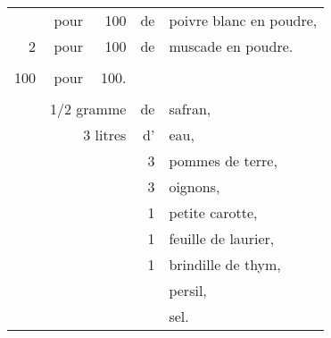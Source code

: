 \begin{longtable}{rrrrp{16em}}
{\begin{tabular}{rrrrl}
              \hspace{4em}            6 & pour & 100  & de & poivre blanc en poudre,          \\ 
              \hspace{4em}            2 & pour & 100  & de & muscade en poudre.               \\ 
              \hspace{4em}   \hrulefill &      &      &    &                                  \\ 
              \hspace{4em}          100 & pour & 100. &    &                                  \\ 
              \end{tabular}},                                                                             \\ 
                                                    \index{Composition de la poudre de curry}
                                                    \index{Curry}
  & \multicolumn{2}{r}{1/2 gramme} & de & safran,                                                         \\
  & \multicolumn{2}{r}{3 litres}   & d' & eau,                                                            \\
  &     &          & 3  & pommes de terre,                                                                \\
  &     &          & 3  & oignons,                                                                        \\
  &     &          & 1  & petite carotte,                                                                 \\
  &     &          & 1  & feuille de laurier,                                                             \\
  &     &          & 1  & brindille de thym,                                                              \\
  &     &          &    & persil,                                                                         \\
  &     &          &    & sel.                                                                            \\
\end{longtable}
\normalsize                                                                                           
\normalsize

